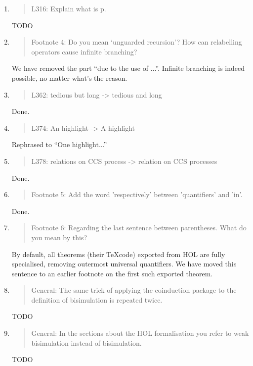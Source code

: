 \begin{enumerate}
\item \begin{quote}
    L316: Explain what is p.
  \end{quote}
  TODO
  
\item \begin{quote}
    Footnote 4: Do you mean ‘unguarded recursion’? How can relabelling operators cause infinite branching?
  \end{quote}
  We have removed the part ``due to the use of ...''. Infinite
  branching is indeed possible, no matter what's the reason.
  
\item \begin{quote}
    L362: tedious but long -> tedious and long
  \end{quote}
  Done.
  
\item \begin{quote}
    L374: An highlight -> A highlight
  \end{quote}
  Rephrased to ``One highlight...''
  
\item \begin{quote}
    L378: relations on CCS process -> relation on CCS processes
  \end{quote}
  Done.
  
\item \begin{quote}
    Footnote 5: Add the word 'respectively' between 'quantifiers' and 'in'.
  \end{quote}
  Done.
  
\item \begin{quote}
    Footnote 6: Regarding the last sentence between parentheses. What do you mean by this?
  \end{quote}
  By default, all theorems (their \TeX code) exported from HOL are
  fully specialised, removing outermost universal quantifiers. We have
  moved this sentence to an earlier footnote on the first such exported theorem.
  
\item \begin{quote}
    General: The same trick of applying the coinduction package to the
    definition of bisimulation is repeated twice.
  \end{quote}
  TODO
  
\item \begin{quote}
    General: In the sections about the HOL formalisation you refer to
    weak bisimulation instead of bisimulation.    
  \end{quote}
  TODO
  

\end{enumerate}
